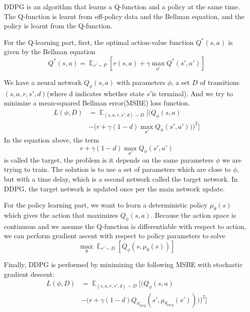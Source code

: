 \documentclass{LTHtwocol} %
\begin{document}
DDPG is an algorithm that learns a Q-function and a policy at the same time. The Q-function is learnt from off-policy data and the Bellman equation, and the policy is learnt from the Q-function.

For the Q-learning part, first, the optimal action-value function $Q^\ast(s,a)$ is given by the Bellman equation
\begin{equation}
    Q^\ast(s,a)= \displaystyle \mathop{\mathbb{E}}_{s'\sim P} [r(s,a)+\gamma \max_{a'}Q^\ast(s',a')]
\end{equation}

We have a neural network $Q_\phi(s,a)$ with parameters $\phi$, a set $D$ of transitions $(s,a,r,s',d)$(where d indicates whether state $s'$is terminal). And we try to minimize a mean-squared Bellman error(MSBE) loss function.
\begin{equation}
\begin{aligned}
L(\phi,D)&=\displaystyle \mathop{\mathbb{E}}_{(s,a,r,s',d)\sim D} \bigg[\bigg(Q_\phi(s,a)\\&-
\Big(r+\gamma(1-d)\max_
{a'} Q_\phi(s',a')\Big)\bigg)^2\bigg]
\end{aligned}
\end{equation}
In the equation above, the term
\[
r+\gamma(1-d)\max_{a'} Q_\phi(s',a')
\]
is called the target, the problem is it depends on the same parameters $\phi$ we are trying to train. The solution is to use a set of parameters which are close to $\phi$, but with a time delay, which is a second network called the target network. In DDPG, the target network is updated once per the main network update.

For the policy learning part, we want to learn a deterministic policy $\mu_\theta(s)$ which gives the action that maximizes $Q_\phi(s,a)$. Because the action space is continuous and we assume the Q-function is differentiable with respect to action, we can perform gradient ascent with respect to policy parameters to solve
\[
\max_\theta \displaystyle \mathop{\mathbb{E}}_{s'\sim D}[Q_\phi(s,\mu_\theta(s))]
\]

Finally, DDPG is performed by minimizing the following MSBE with stochastic gradient descent:
\begin{equation}
\begin{aligned}
L(\phi,D)&=\displaystyle \mathop{\mathbb{E}}_{(s,a,r,s',d)\sim D} \bigg[\bigg(Q_\phi(s,a)\\&-\Big(r+\gamma(1-d) Q_{\phi_{targ}}(s',\mu_{\theta_{targ}}(s'))\Big)\bigg)^2\bigg]
\end{aligned}
\end{equation}
\end{document}

